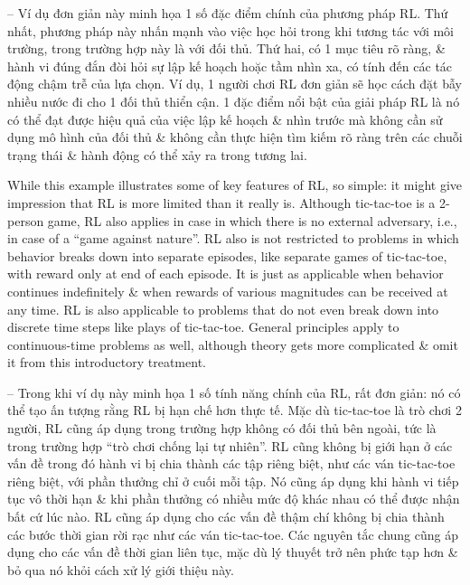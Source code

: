 \documentclass{article}
\begin{document}
\begin{itemize}
\begin{itemize}
        -- Ví dụ đơn giản này minh họa 1 số đặc điểm chính của phương pháp RL. Thứ nhất, phương pháp này nhấn mạnh vào việc học hỏi trong khi tương tác với môi trường, trong trường hợp này là với đối thủ. Thứ hai, có 1 mục tiêu rõ ràng, \& hành vi đúng đắn đòi hỏi sự lập kế hoạch hoặc tầm nhìn xa, có tính đến các tác động chậm trễ của lựa chọn. Ví dụ, 1 người chơi RL đơn giản sẽ học cách đặt bẫy nhiều nước đi cho 1 đối thủ thiển cận. 1 đặc điểm nổi bật của giải pháp RL là nó có thể đạt được hiệu quả của việc lập kế hoạch \& nhìn trước mà không cần sử dụng mô hình của đối thủ \& không cần thực hiện tìm kiếm rõ ràng trên các chuỗi trạng thái \& hành động có thể xảy ra trong tương lai.

        While this example illustrates some of key features of RL, so simple: it might give impression that RL is more limited than it really is. Although tic-tac-toe is a 2-person game, RL also applies in case in which there is no external adversary, i.e., in case of a ``game against nature''. RL also is not restricted to problems in which behavior breaks down into separate episodes, like separate games of tic-tac-toe, with reward only at end of each episode. It is just as applicable when behavior continues indefinitely \& when rewards of various magnitudes can be received at any time. RL is also applicable to problems that do not even break down into discrete time steps like plays of tic-tac-toe. General principles apply to continuous-time problems as well, although theory gets more complicated \& omit it from this introductory treatment.

        -- Trong khi ví dụ này minh họa 1 số tính năng chính của RL, rất đơn giản: nó có thể tạo ấn tượng rằng RL bị hạn chế hơn thực tế. Mặc dù tic-tac-toe là trò chơi 2 người, RL cũng áp dụng trong trường hợp không có đối thủ bên ngoài, tức là trong trường hợp ``trò chơi chống lại tự nhiên''. RL cũng không bị giới hạn ở các vấn đề trong đó hành vi bị chia thành các tập riêng biệt, như các ván tic-tac-toe riêng biệt, với phần thưởng chỉ ở cuối mỗi tập. Nó cũng áp dụng khi hành vi tiếp tục vô thời hạn \& khi phần thưởng có nhiều mức độ khác nhau có thể được nhận bất cứ lúc nào. RL cũng áp dụng cho các vấn đề thậm chí không bị chia thành các bước thời gian rời rạc như các ván tic-tac-toe. Các nguyên tắc chung cũng áp dụng cho các vấn đề thời gian liên tục, mặc dù lý thuyết trở nên phức tạp hơn \& bỏ qua nó khỏi cách xử lý giới thiệu này.


\end{itemize}
\end{itemize}
\end{document}
